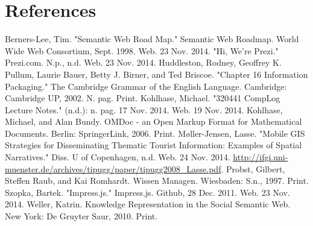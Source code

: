 \documentclass[twoside]{article}
\begin{document}
\section{References}
\begin{thebibliography}{} %

Berners-Lee, Tim. "Semantic Web Road Map." Semantic Web Roadmap. World Wide Web Consortium, Sept. 1998. Web. 23 Nov. 2014.
"Hi, We're Prezi." Prezi.com. N.p., n.d. Web. 23 Nov. 2014.
Huddleston, Rodney, Geoffrey K. Pullum, Laurie Bauer, Betty J. Birner, and Ted Briscoe. "Chapter 16 Information Packaging." The Cambridge Grammar of the English Language. Cambridge: Cambridge UP, 2002. N. pag. Print.
Kohlhase, Michael. "320441 CompLog Lecture Notes." (n.d.): n. pag. 17 Nov. 2014. Web. 19 Nov. 2014.
Kohlhase, Michael, and Alan Bundy. OMDoc - an Open Markup Format for Mathematical Documents. Berlin: SpringerLink, 2006. Print.
M{\o}ller-Jensen, Lasse. "Mobile GIS Strategies for Disseminating Thematic Tourist Information: Examples of Spatial Narratives." Diss. U of Copenhagen, n.d. Web. 24 Nov. 2014. \href{http://ifgi.uni-muenster.de/archives/tipugg/paper/tipugg2008_Lasse.pdf}{http://ifgi.uni-muenster.de/archives/tipugg/paper/tipugg2008\_Lasse.pdf}.
Probst, Gilbert, Steffen Raub, and Kai Romhardt. \newblock Wissen Managen. \newblock Wiesbaden: S.n., 1997. Print.
Szopka, Bartek. "Impress.js." Impress.js. Github, 28 Dec. 2011. Web. 23 Nov. 2014.
Weller, Katrin. Knowledge Representation in the Social Semantic Web. New York: De Gruyter Saur, 2010. Print.
\end{thebibliography}

\end{document}
